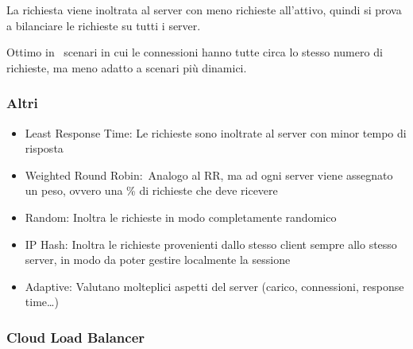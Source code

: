\documentclass[
]{article}
\providecommand{\tightlist}{%
  \setlength{\itemsep}{0pt}\setlength{\parskip}{0pt}}
\begin{document}
{La richiesta viene inoltrata al server con meno richieste all'attivo,
quindi si prova a bilanciare le richieste su tutti i server.}

{Ottimo in ~scenari in cui le connessioni hanno tutte circa lo stesso
numero di richieste, ma meno adatto a scenari più dinamici.}

\subsubsection{\texorpdfstring{{Altri}}{Altri}}\label{h.ylbbgtvc5jxa}

\begin{itemize}
\tightlist
\item
  {Least Response Time}{: Le richieste sono inoltrate al server con
  minor tempo di risposta }
\end{itemize}

{}

\begin{itemize}
\tightlist
\item
  {Weighted Round Robin:}{~Analogo al RR, ma ad ogni server viene
  assegnato un peso, ovvero una \% di richieste che deve ricevere}
\end{itemize}

{}

\begin{itemize}
\tightlist
\item
  {Random}{: Inoltra le richieste in modo completamente randomico }
\end{itemize}

{}

\begin{itemize}
\tightlist
\item
  {IP Hash}{: Inoltra le richieste provenienti dallo stesso client
  sempre allo stesso server, in modo da poter gestire localmente la
  sessione }
\end{itemize}

{}

\begin{itemize}
\tightlist
\item
  {Adaptive}{: Valutano molteplici aspetti del server (carico,
  connessioni, response time\ldots)}
\end{itemize}

\subsubsection{\texorpdfstring{{Cloud Load
Balancer}}{Cloud Load Balancer}}\label{h.83w2dgohryv1}
\end{document}
